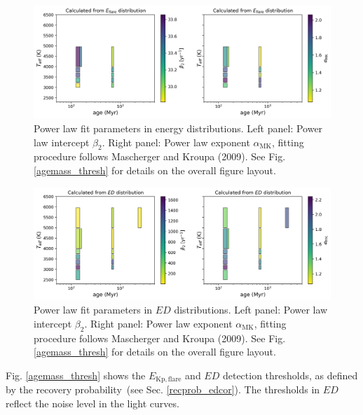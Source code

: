 \documentclass{aa}
\begin{document}
   \begin{figure}
            \includegraphics[width=\hsize]{pics/age_mass_AM/beta2_alpha_MK_erg_erg_2019_03_22_15.png}
         \caption{Power law fit parameters in energy distributions. Left panel: Power law intercept $\beta_2$. Right panel: Power law exponent $\alpha_\mathrm{MK}$, fitting procedure follows Mascherger and Kroupa (2009). See Fig. \ref{agemass_thresh} for details on the overall figure layout.}
          \label{agemass_alphabeta_erg}
   \end{figure}
   \begin{figure}
            \includegraphics[width=\hsize]{pics/age_mass_AM/beta2_alpha_MK_s_s_2019_03_22_15.png}
          \caption{Power law fit parameters in $ED$ distributions. Left panel: Power law intercept $\beta_2$. Right panel: Power law exponent $\alpha_\mathrm{MK}$, fitting procedure follows Mascherger and Kroupa (2009). See Fig. \ref{agemass_thresh} for details on the overall figure layout.}
          \label{agemass_alphabeta_s}
   \end{figure}

Fig. \ref{agemass_thresh} shows the $E_\mathrm{Kp,flare}$ and $ED$ detection thresholds, as defined by the recovery probability~(see Sec. \ref{recprob_edcor}). The thresholds in $ED$ reflect the noise level in the light curves.
\end{document}
